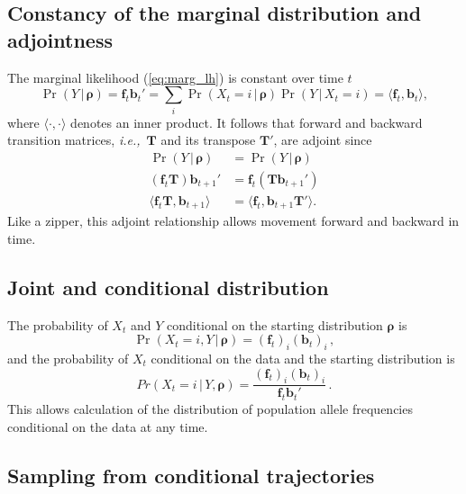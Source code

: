 \documentclass[preprint]{elsarticle}
\newcommand{\bs}[1]{\ensuremath{\boldsymbol{#1}}}
\newcommand\given{{\,|\,}}
\newcommand\ie{{\it i.e.,}}
\newcommand\x[1]{\ensuremath{X_{#1}}}
\newcommand\y{\ensuremath{Y}}
\newcommand\fv[1]{\ensuremath{\mathbf{f}_{#1}}}
\newcommand\bv[1]{\ensuremath{\mathbf{b}_{#1}}}
\begin{document}
\subsection{Constancy of the marginal distribution and adjointness}

The marginal likelihood (\ref{eq:marg_lh}) is constant over time $t$ 
\begin{equation}
\Pr(\y \given \bs{\rho}) = \fv{t}\bv{t}' =\sum_i \Pr(\x{t}=i \given \bs{\rho}) \Pr(\y \given \x{t}=i) = \langle \fv{t}, \bv{t} \rangle,
\end{equation}
where $\langle \cdot , \cdot \rangle$ denotes an inner product.  It follows that forward and backward transition matrices, \ie\ $\mathbf{T}$ and its transpose $\mathbf{T}'$, are adjoint since
\begin{equation}\label{eq:adjoint_discrete}
\begin{split}
\Pr(\y \given \bs{\rho})              &= \Pr(\y \given \bs{\rho}) \\
(\fv{t}\mathbf{T})\bv{t+1}' &= \fv{t} (\mathbf{T}\bv{t+1}') \\
\langle \fv{t}\mathbf{T},\bv{t+1} \rangle   &= \langle  \fv{t},\bv{t+1}\mathbf{T}' \rangle.
\end{split}
\end{equation}
Like a zipper, this adjoint relationship allows movement forward and backward in time.

\subsection{Joint and conditional distribution}

The probability of $\x{t}$ and $\y$ conditional on the starting distribution $\bs{\rho}$ is
\begin{equation}\label{eq:joint_xy_discr}
\Pr(\x{t}=i,\y \given \bs{\rho}) = (\fv{t})_i (\bv{t})_i\,,
\end{equation}
and the probability of $\x{t}$ conditional on the data and the starting distribution is
\begin{equation}\label{eq:cond_x|y_discr}
Pr(\x{t}=i \given \y,\bs{\rho}) = \frac{(\fv{t})_i (\bv{t})_i}{\fv{t}\bv{t}'}\,.
\end{equation}
This allows calculation of the distribution of population allele frequencies conditional on the data at any time.

\subsection{Sampling from conditional trajectories}
\end{document}

